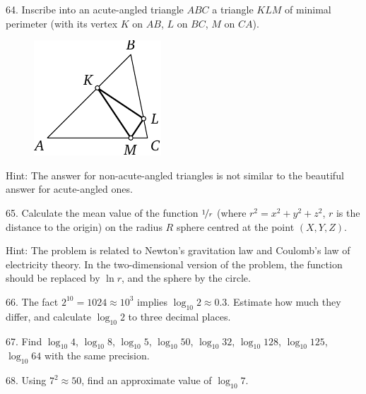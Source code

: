 \begin{problem}{64.}
	Inscribe into an acute-angled triangle $ABC$ a triangle $KLM$ of minimal perimeter
	(with its vertex $K$ on $AB$, $L$ on $BC$, $M$ on $CA$).
	\begin{figure}
		\includegraphics{resources/taskbook-48}
	\end{figure}

	\begin{note}{Hint:}
		The answer for non-acute-angled triangles is not similar to the beautiful answer for acute-angled ones.
	\end{note}
\end{problem}

\begin{problem}{65.}
	Calculate the mean value of the function  $\nicefrac{1}{r}$ (where
	$r^2=x^2+y^2+z^2$, $r$ is the distance to the origin) on the radius
	$R$ sphere centred at the point $(X,Y,Z)$.

	\begin{note}{Hint:}
		The problem is related to Newton's gravitation law and Coulomb's law of electricity theory.
		In the two-dimensional version of the problem, the function should be replaced by $\ln r$, and the sphere by the circle.
	\end{note}
\end{problem}

\begin{problem}{66.}
	The fact $2^{10}=1024 \approx 10^3$ implies
	$\log_{10} 2 \approx 0.3$. 	Estimate how much they differ, and calculate $\log_{10} 2$ to three decimal places.
\end{problem}

\begin{problem}{67.}
	Find $\log_{10} 4$, $\log_{10} 8$,
	$\log_{10} 5$, $\log_{10} 50$, $\log_{10} 32$, $\log_{10} 128$,
	$\log_{10} 125$, $\log_{10} 64$ with the same precision.
\end{problem}

\begin{problem}{68.}
	Using $7^2 \approx 50$, find an approximate value of $\log_{10} 7$.
\end{problem}

